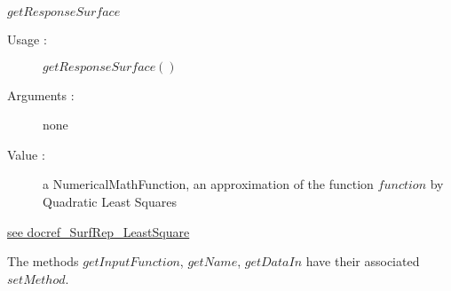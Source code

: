 \begin{description}
\begin{description}
  \item $getResponseSurface$
    \begin{description}
    \item[Usage :] $getResponseSurface()$ %
    \item[Arguments :] none
    \item[Value :] a NumericalMathFunction, an approximation of the function $function$ by Quadratic Least Squares
    \end{description}

  \end{description}

\item[Links :]\rule{0pt}{1em}
  \href{./Version/docref_SurfRep_LeastSquare_en.pdf}{see docref\_SurfRep\_LeastSquare}
\end{description}

The methods $getInputFunction$, $getName$, $getDataIn$ have their associated $setMethod$.


